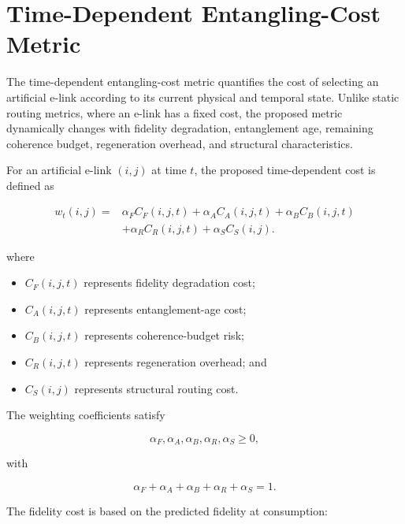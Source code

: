 \section{Time-Dependent Entangling-Cost Metric}

The time-dependent entangling-cost metric quantifies the cost of selecting an artificial e-link according to its current physical and temporal state. Unlike static routing metrics, where an e-link has a fixed cost, the proposed metric dynamically changes with fidelity degradation, entanglement age, remaining coherence budget, regeneration overhead, and structural characteristics.

For an artificial e-link $(i,j)$ at time $t$, the proposed time-dependent cost is defined as

\begin{equation}
\begin{aligned}
w_t(i,j)
={}&
\alpha_F C_F(i,j,t)
+\alpha_A C_A(i,j,t)
+\alpha_B C_B(i,j,t)
\\
&+
\alpha_R C_R(i,j,t)
+\alpha_S C_S(i,j).
\end{aligned}
\end{equation}

where

\begin{itemize}
    \item $C_F(i,j,t)$ represents fidelity degradation cost;
    \item $C_A(i,j,t)$ represents entanglement-age cost;
    \item $C_B(i,j,t)$ represents coherence-budget risk;
    \item $C_R(i,j,t)$ represents regeneration overhead; and
    \item $C_S(i,j)$ represents structural routing cost.
\end{itemize}

The weighting coefficients satisfy

\begin{equation}
    \alpha_F,\alpha_A,\alpha_B,\alpha_R,\alpha_S
    \geq 0,
\end{equation}

with

\begin{equation}
    \alpha_F
    +
    \alpha_A
    +
    \alpha_B
    +
    \alpha_R
    +
    \alpha_S
    =
    1.
\end{equation}

The fidelity cost is based on the predicted fidelity at consumption:

